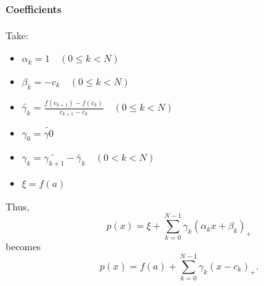 \documentclass[]{article}
\begin{document}
\paragraph{Coefficients}
Take:
\begin{itemize}
	\item $\alpha_k = 1 \quad (0 \leq k < N)$
	\item $\beta_k = -c_k \quad (0 \leq k < N)$
	\item $\tilde{\gamma_k} = \frac{f(c_{k+1})-f(c_k)}{c_{k+1}-c_k} \quad (0 \leq k < N)$
	\item $\gamma_0 = \tilde{\gamma0}$
	\item $\gamma_k = \tilde{\gamma_{k+1}} - \tilde{\gamma_k}  \quad (0 < k < N)$
	\item $\xi = f(a)$
\end{itemize}
Thus, $$p(x) = \xi + \sum_{k=0}^{N-1} \gamma_k (\alpha_k x + \beta_k)_+$$
becomes $$p(x) = f(a) + \sum_{k=0}^{N-1} \gamma_k (x - c_k)_+.$$
\end{document}

